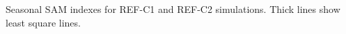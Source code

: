 \label{fig:SAM}
Seasonal SAM indexes for REF-C1 and REF-C2 simulations. Thick lines show least square lines.